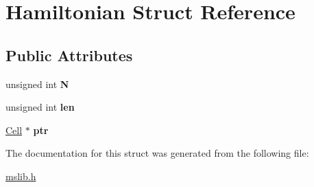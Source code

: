 \hypertarget{structHamiltonian}{\section{Hamiltonian Struct Reference}
\label{structHamiltonian}
}
\subsection*{Public Attributes}
\begin{DoxyCompactItemize}
\item 
\hypertarget{structHamiltonian_a3cae9634a97ff7ae85cd649df9e16846}{unsigned int {\bfseries N}}\label{structHamiltonian_a3cae9634a97ff7ae85cd649df9e16846}

\item 
\hypertarget{structHamiltonian_a66d7c87489a666261f0ea6a2af71a25c}{unsigned int {\bfseries len}}\label{structHamiltonian_a66d7c87489a666261f0ea6a2af71a25c}

\item 
\hypertarget{structHamiltonian_a93bb00c7e52a408154aaace965a05623}{\hyperlink{structCell}{Cell} $\ast$ {\bfseries ptr}}\label{structHamiltonian_a93bb00c7e52a408154aaace965a05623}

\end{DoxyCompactItemize}


The documentation for this struct was generated from the following file\-:\begin{DoxyCompactItemize}
\item 
\hyperlink{mslib_8h}{mslib.\-h}\end{DoxyCompactItemize}
